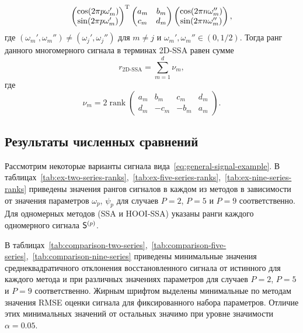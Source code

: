 \documentclass[specialist,
    substylefile = spbu_report.rtx,
    subf,href,colorlinks=true, 12pt]{disser}
\theoremstyle{plain}
\theoremstyle{definition}
\newtheorem{example}{Пример}[section]
\theoremstyle{remark}
\begin{document}
\begin{description}
\[\begin{pmatrix}
                \cos(2\pi p\omega_m') \\
                \sin(2\pi p\omega_m')
            \end{pmatrix}^{\mathrm{T}}
            \begin{pmatrix}
                a_m & b_m \\
                c_m & d_m
            \end{pmatrix}
            \begin{pmatrix}
                \cos(2\pi n\omega_m'') \\
                \sin(2\pi n\omega_m'')
            \end{pmatrix},
        \]
        где $(\omega_m', \omega_m'') \ne (\omega_j', \omega_j'')$ для $m\ne j$ и $\omega_m', \omega_m'' \in (0, 1/2)$.
        Тогда ранг данного многомерного сигнала в терминах 2D-SSA равен сумме
        \[
            r_\text{2D-SSA} = \sum_{m=1}^{d} \nu_m,
        \]
        где
        \[
            \nu_m = 2\operatorname{rank}\begin{pmatrix}
                                            a_m & b_m  & c_m  & d_m \\
                                            d_m & -c_m & -b_m & a_m
            \end{pmatrix}.
        \]
    \end{description}

    \subsection{Результаты численных сравнений}\label{subsec:numerical-comp-signal}
    Рассмотрим некоторые варианты сигнала вида~\eqref{eq:general-signal-example}.
    В таблицах~\ref{tab:ex-two-series-ranks},~\ref{tab:ex-five-series-ranks},~\ref{tab:ex-nine-series-ranks}
    приведены значения рангов сигналов в каждом из методов в зависимости от значения параметров $\omega_p$, $\psi_p$
    для случаев $P=2$, $P=5$ и $P=9$
    соответственно.
    Для одномерных методов (SSA и HOOI-SSA) указаны ранги каждого одномерного сигнала $\mathsf{S}^{(p)}$.

    В таблицах~\ref{tab:comparison-two-series},~\ref{tab:comparison-five-series},~\ref{tab:comparison-nine-series}
    приведены минимальные значения среднеквадратичного отклонения
    восстановленного сигнала от истинного для каждого метода и при различных значениях параметров
    для случаев $P=2$, $P=5$ и $P=9$
    соответственно.
    Жирным шрифтом выделены минимальные по методам значения RMSE оценки сигнала
    для фиксированного набора параметров.
    Отличие этих минимальных значений от остальных значимо при уровне значимости $\alpha=0.05$.
\end{document}
